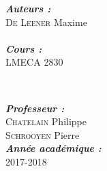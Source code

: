 \begin{titlepage}
\begin{minipage}{0.4\textwidth}
\begin{flushleft} \large
\emph{\textbf{Auteurs :}}\\

\textsc{De Leener} Maxime\\

\\[0,4cm]
\emph{\textbf{Cours :\ }}\\\textsc{\large LMECA 2830}\\[0.4cm] %


\end{flushleft}
\end{minipage}
~
\begin{minipage}{0.4\textwidth}
\begin{flushright} \large

\emph{\textbf{Professeur :}} \\
\textsc{Chatelain} Philippe\\
\textsc{Schrooyen} Pierre\\ [0,4cm]

\emph{\textbf{Année académique :\ }}\\\textsc{\large 2017-2018}\\[0.4cm] %


\end{flushright}
\end{minipage}\\[0cm]


~
\begin{minipage}{0.4\textwidth}

\end{minipage}

\vfill %

\end{titlepage}